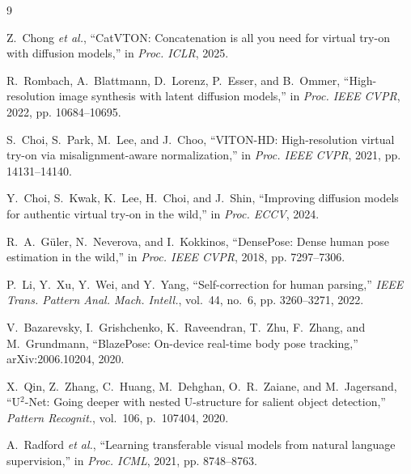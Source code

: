 \documentclass{article}
\begin{document}
{\small
\begin{thebibliography}{9}

Z.~Chong \emph{et al.}, ``CatVTON: Concatenation is all you need for virtual try-on with diffusion
models,'' in \emph{Proc. ICLR}, 2025.

R.~Rombach, A.~Blattmann, D.~Lorenz, P.~Esser, and B.~Ommer, ``High-resolution image synthesis with
latent diffusion models,'' in \emph{Proc. IEEE CVPR}, 2022, pp. 10684--10695.

S.~Choi, S.~Park, M.~Lee, and J.~Choo, ``VITON-HD: High-resolution virtual try-on via
misalignment-aware normalization,'' in \emph{Proc. IEEE CVPR}, 2021, pp. 14131--14140.

Y.~Choi, S.~Kwak, K.~Lee, H.~Choi, and J.~Shin, ``Improving diffusion models for authentic virtual
try-on in the wild,'' in \emph{Proc. ECCV}, 2024.

R.~A.~G{\"u}ler, N.~Neverova, and I.~Kokkinos, ``DensePose: Dense human pose estimation in the wild,''
in \emph{Proc. IEEE CVPR}, 2018, pp. 7297--7306.

P.~Li, Y.~Xu, Y.~Wei, and Y.~Yang, ``Self-correction for human parsing,'' \emph{IEEE Trans. Pattern
Anal. Mach. Intell.}, vol.~44, no.~6, pp. 3260--3271, 2022.

V.~Bazarevsky, I.~Grishchenko, K.~Raveendran, T.~Zhu, F.~Zhang, and M.~Grundmann, ``BlazePose:
On-device real-time body pose tracking,'' arXiv:2006.10204, 2020.

X.~Qin, Z.~Zhang, C.~Huang, M.~Dehghan, O.~R.~Zaiane, and M.~Jagersand, ``U$^2$-Net: Going deeper with
nested U-structure for salient object detection,'' \emph{Pattern Recognit.}, vol.~106, p.~107404, 2020.

A.~Radford \emph{et al.}, ``Learning transferable visual models from natural language supervision,''
in \emph{Proc. ICML}, 2021, pp. 8748--8763.

\end{thebibliography}
}
\end{document}
